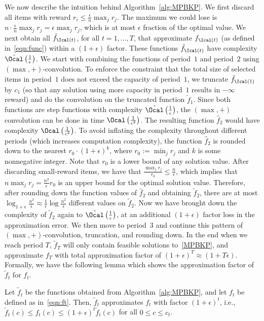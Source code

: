 \documentclass[11pt]{article}
\begin{document}
We now describe the intuition behind Algorithm~\ref{alg:MPBKP}. We first discard all items with reward $r_i\le \frac{\epsilon}{n}\max_jr_j$. The maximum we could lose is $n\cdot \frac{\epsilon}{n}\max_jr_j = \epsilon\max_jr_j$, which is at most $\epsilon$ fraction of the optimal value. We next obtain all $\tilde{f}_{\Ical(t)}$, for all $t=1,\ldots, T$, that approximate $f_{\Ical(t)}$ (as defined in~\eqref{eqn:func}) within a $(1+\epsilon)$ factor. These functions $\tilde{f}_{\Ical(t)}$ have complexity $\tilde{\Ocal}\left(\frac{1}{\epsilon}\right)$. We start with combining the functions of period~$1$ and period~$2$ using $(\max,+)$-convolution. To enforce the constraint that the total size of selected items in period~$1$ does not exceed the capacity of period~$1$, we truncate $\tilde{f}_{\Ical(1)}$ by $c_1$ (so that any solution using more capacity in period~$1$ results in $-\infty$ reward) and do the convolution on the truncated function $\tilde{f}_1$. Since both functions are step functions with complexity $\tilde{\Ocal}\left(\frac{1}{\epsilon}\right)$, the $(\max,+)$ convolution can be done in time $\Ocal\left(\frac{1}{\epsilon^2}\right)$. The resulting function $\hat{f}_2$ would have complexity $\Ocal\left(\frac{1}{\epsilon^2}\right)$. To avoid inflating the complexity throughout different periods (which increases computation complexity), the function $\hat{f}_2$ is rounded down to the nearest $r_0\cdot (1+\epsilon)^k$, where $r_0:=\min_jr_j$ and $k$ is some nonnegative integer. Note that $r_0$ is a lower bound of any solution value. After discarding small-reward items, we have that $\frac{\max_jr_j}{r_0}\le \frac{n}{\epsilon}$, which implies that $n\max_jr_j = \frac{n^2}{\epsilon}r_0$ is an upper bound for the optimal solution value. Therefore, after rounding down the function values of $\hat{f}_2$ and obtaining $\tilde{f}_2$, there are at most $\log_{1+\epsilon}\frac{n^2}{\epsilon}\approx \frac{1}{\epsilon}\log\frac{n^2}{\epsilon}$ different values on $\tilde{f}_2$. Now we have brought down the complexity of $\tilde{f}_2$ again to $\tilde{\Ocal}\left(\frac{1}{\epsilon}\right)$, at an additional $(1+\epsilon)$ factor loss in the approximation error. We then move to period~$3$ and continue this pattern of $(\max,+)$-convolution, truncation, and rounding down. In the end when we reach period $T$, $\tilde{f}_T$ will only contain feasible solutions to~\eqref{MPBKP}, and approximate $f_T$ with total approximation factor of $(1+\epsilon)^T\approx (1+T\epsilon)$. Formally, we have the following lemma which shows the approximation factor of $\tilde{f}_t$ for $f_t$.
\begin{lemma}\label{lem:fapprox}
Let $\tilde{f}_t$ be the functions obtained from Algorithm~\ref{alg:MPBKP}, and let $f_t$ be defined as in~\eqref{eqn:ft}. Then, $\tilde{f}_t$ approximates $f_t$ with factor $(1+\epsilon)^t$, i.e., $\tilde{f}_t(c)\le f_t(c)\le (1+\epsilon)^t\tilde{f}_t(c)$ for all $0\le c\le c_t$.
\end{lemma}
\end{document}
